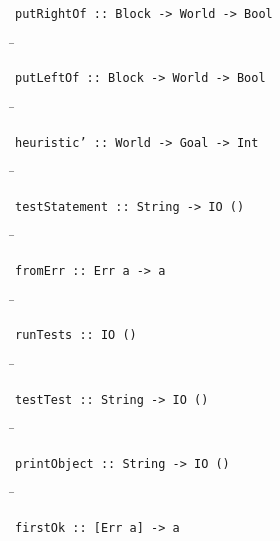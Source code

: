 \begin{verbatim}
putRightOf :: Block -> World -> Bool
\end{verbatim}
\begin{tabbing}
\hspace*{1cm}\= \kill
\> 
\end{tabbing}
\begin{verbatim}
putLeftOf :: Block -> World -> Bool
\end{verbatim}
\begin{tabbing}
\hspace*{1cm}\= \kill
\> 
\end{tabbing}
\begin{verbatim}
heuristic’ :: World -> Goal -> Int
\end{verbatim}
\begin{tabbing}
\hspace*{1cm}\= \kill
\> 
\end{tabbing}
\begin{verbatim}
testStatement :: String -> IO ()
\end{verbatim}
\begin{tabbing}
\hspace*{1cm}\= \kill
\> 
\end{tabbing}
\begin{verbatim}
fromErr :: Err a -> a
\end{verbatim}
\begin{tabbing}
\hspace*{1cm}\= \kill
\> 
\end{tabbing}
\begin{verbatim}
runTests :: IO ()
\end{verbatim}
\begin{tabbing}
\hspace*{1cm}\= \kill
\> 
\end{tabbing}
\begin{verbatim}
testTest :: String -> IO ()
\end{verbatim}
\begin{tabbing}
\hspace*{1cm}\= \kill
\> 
\end{tabbing}
\begin{verbatim}
printObject :: String -> IO ()
\end{verbatim}
\begin{tabbing}
\hspace*{1cm}\= \kill
\> 
\end{tabbing}
\begin{verbatim}
firstOk :: [Err a] -> a
\end{verbatim}
